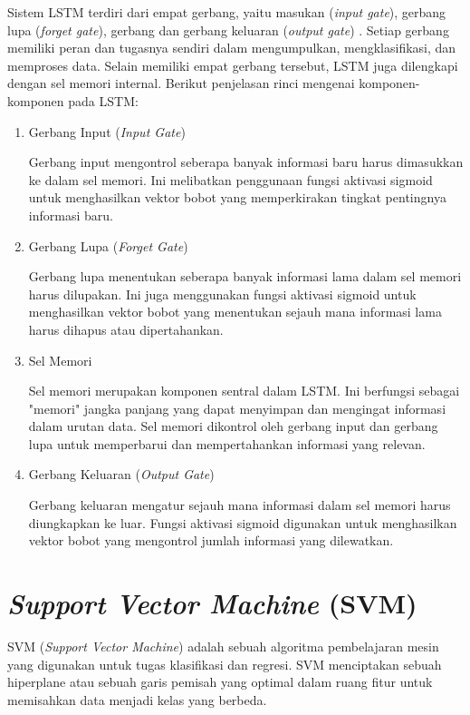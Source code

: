 Sistem LSTM terdiri dari empat gerbang, yaitu masukan (\emph{input gate}), gerbang
lupa (\emph{forget gate}), gerbang dan gerbang keluaran (\emph{output gate}) \parencite{27}.
Setiap gerbang memiliki peran dan tugasnya sendiri dalam mengumpulkan,
mengklasifikasi, dan memproses data. Selain memiliki empat gerbang tersebut,
LSTM juga dilengkapi dengan sel memori internal. Berikut penjelasan rinci mengenai komponen-komponen
pada LSTM:

\begin{enumerate}[nolistsep]
  \item Gerbang Input (\emph{Input Gate})

        Gerbang input mengontrol seberapa banyak informasi baru harus
        dimasukkan ke dalam sel memori. Ini melibatkan penggunaan fungsi
        aktivasi sigmoid untuk menghasilkan vektor bobot yang memperkirakan
        tingkat pentingnya informasi baru.

  \item Gerbang Lupa (\emph{Forget Gate})

        Gerbang lupa menentukan seberapa banyak informasi lama dalam sel
        memori harus dilupakan. Ini juga menggunakan fungsi aktivasi sigmoid
        untuk menghasilkan vektor bobot yang menentukan sejauh mana informasi
        lama harus dihapus atau dipertahankan.

  \item Sel Memori

        Sel memori merupakan komponen sentral dalam LSTM. Ini berfungsi
        sebagai "memori" jangka panjang yang dapat menyimpan dan mengingat
        informasi dalam urutan data. Sel memori dikontrol oleh gerbang input
        dan gerbang lupa untuk memperbarui dan mempertahankan informasi yang
        relevan.

  \item Gerbang Keluaran (\emph{Output Gate})

        Gerbang keluaran mengatur sejauh mana informasi dalam sel memori harus
        diungkapkan ke luar. Fungsi aktivasi sigmoid digunakan untuk menghasilkan
        vektor bobot yang mengontrol jumlah informasi yang dilewatkan.
\end{enumerate}

\section{\emph{Support Vector Machine} (SVM)}

SVM (\emph{Support Vector Machine}) adalah sebuah algoritma pembelajaran mesin yang
digunakan untuk tugas klasifikasi dan regresi. SVM menciptakan sebuah
hiperplane atau sebuah garis pemisah yang optimal dalam ruang fitur untuk
memisahkan data menjadi kelas yang berbeda. \parencite{28}

